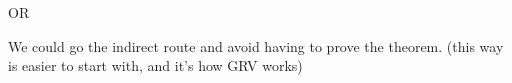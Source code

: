 OR

We could go the indirect route and avoid having to prove the theorem.
(this way is easier to start with, and it's how GRV works)


